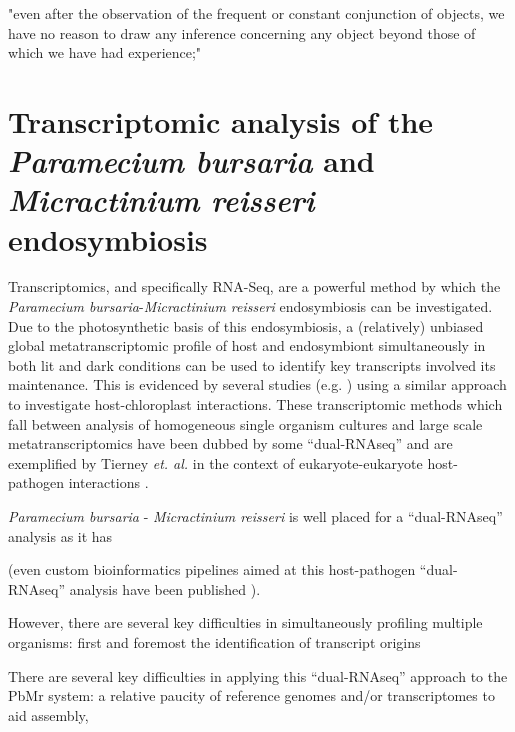 \graphicspath{{chapters/4.Chapter_2/figures}}

\begin{savequote}[75mm]
"even after the observation of the frequent or constant conjunction of objects, we have no reason to draw any inference concerning any object beyond those of which we have had experience;"
\end{savequote}


\chapter{Transcriptomic analysis of the \textit{Paramecium bursaria} and \textit{Micractinium reisseri} endosymbiosis}

Transcriptomics, and specifically RNA-Seq, are a powerful method by which the \textit{Paramecium bursaria}-\textit{Micractinium reisseri}
endosymbiosis can be investigated. Due to the photosynthetic basis of this endosymbiosis, a (relatively) unbiased
global metatranscriptomic profile of host and endosymbiont simultaneously in both lit and dark conditions can be used
to identify key transcripts involved its maintenance. This is evidenced by several studies (e.g. \citep{Nowack2011,Jiggins2013,Xiang2015}) using a similar approach
to investigate host-chloroplast interactions. These transcriptomic methods which fall between analysis of homogeneous single organism cultures and
large scale metatranscriptomics have been dubbed by some ``dual-RNAseq'' \citep{Westermann2012} and are exemplified by Tierney \textit{et. al.} in the context 
of eukaryote-eukaryote host-pathogen interactions \citep{Tieryney2012}.

\textit{Paramecium bursaria} - \textit{Micractinium reisseri} is well placed for a ``dual-RNAseq'' analysis as it has 




(even custom bioinformatics pipelines aimed at this host-pathogen ``dual-RNAseq'' analysis have been published \citep{Xu2015}).




However, there are several key difficulties in simultaneously profiling multiple organisms: first and foremost the identification
of transcript origins 




There are several key difficulties in applying this ``dual-RNAseq'' approach to the PbMr system: a relative paucity of
reference genomes and/or transcriptomes to aid assembly, 

